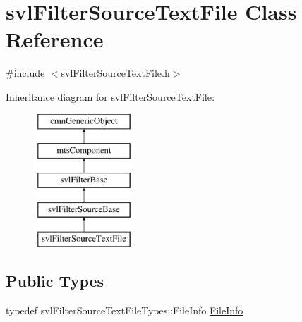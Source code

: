 \hypertarget{classsvl_filter_source_text_file}{}\section{svl\+Filter\+Source\+Text\+File Class Reference}
\label{classsvl_filter_source_text_file}


{\ttfamily \#include $<$svl\+Filter\+Source\+Text\+File.\+h$>$}

Inheritance diagram for svl\+Filter\+Source\+Text\+File\+:\begin{figure}[H]
\begin{center}
\leavevmode
\includegraphics[height=5.000000cm]{de/d87/classsvl_filter_source_text_file}
\end{center}
\end{figure}
\subsection*{Public Types}
\begin{DoxyCompactItemize}
\item 
typedef svl\+Filter\+Source\+Text\+File\+Types\+::\+File\+Info \hyperlink{classsvl_filter_source_text_file_a84944643e5cff813e434ffcdb29be62d}{File\+Info}
\end{DoxyCompactItemize}
